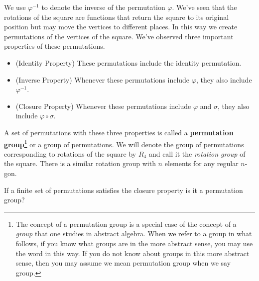 We use $\varphi^{-1}$ to denote the inverse of the permutation $\varphi$.
We've seen that the rotations of the square are functions that return the
square to its original position but may move the vertices to different
places.  In this way we create permutations of the vertices of the
square.  We've observed three important properties of these permutations.

\begin{itemize}\item (Identity Property) These
permutations include the identity permutation.  
\item (Inverse Property) Whenever these
permutations include
$\varphi$, they also include $\varphi^{-1}$.
\item (Closure Property)  Whenever these
permutations include
$\varphi$ and $\sigma$, they also include $\varphi\circ\sigma$.
\end{itemize}

A set of permutations with these three properties is called a {\bf
permutation group}\footnote{The concept of a permutation group is a
special case of the concept of a {\em group} that one studies in abstract
algebra.  When we refer to a group in what follows, if you  know what
groups are in the more abstract sense, you may use the word in this way. 
If you do not know about groups in this more abstract sense, then you may
assume we mean permutation group when we say group.} or a group of
permutations.  We
will denote the group of permutations corresponding to rotations of the
square  by $R_4$ and call it the {\em rotation group} of the square.  There is a similar rotation group with $n$
elements for any regular $n$-gon.

\bp \iteme If a finite set of permutations  satisfies the closure
property is it a permutation group?

